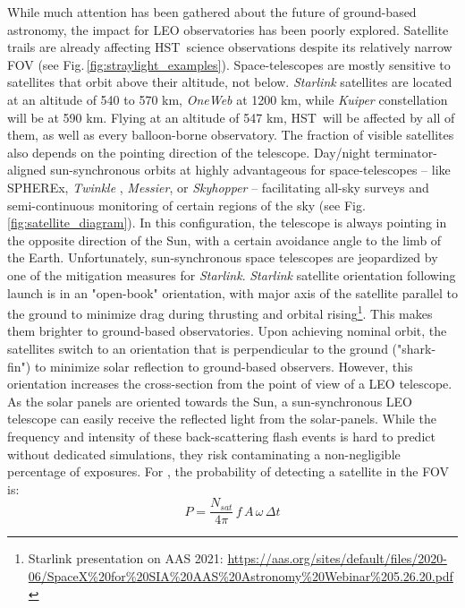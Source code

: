 \documentclass[usenames,dvipsnames,modern]{CLASS_FILES/aastex631}  %
\newcommand{\Hubble}{HST}
\begin{document}
While much attention has been gathered about the future of ground-based astronomy, the impact for LEO observatories has been poorly explored. Satellite trails are already affecting \Hubble\ science observations despite its relatively narrow FOV (see Fig.\,\ref{fig:straylight_examples}). Space-telescopes are mostly sensitive to satellites that orbit above their altitude, not below. \emph{Starlink} satellites are located at an altitude of 540 to 570 km, \emph{OneWeb} at 1200 km, while \emph{Kuiper} constellation will be at 590 km. Flying at an altitude of 547 km, \Hubble\ will be affected by all of them, as well as every balloon-borne observatory. The fraction of visible satellites also depends on the pointing direction of the telescope. Day/night terminator-aligned sun-synchronous orbits at highly advantageous for space-telescopes -- like SPHEREx, \emph{Twinkle} \citep{edwards+2020inproceedings_2027}, \emph{Messier}, or \emph{Skyhopper} -- facilitating all-sky surveys and semi-continuous monitoring of certain regions of the sky (see Fig.\,\ref{fig:satellite_diagram}). In this configuration, the telescope is always pointing in the opposite direction of the Sun, with a certain avoidance angle to the limb of the Earth. Unfortunately, sun-synchronous space telescopes are jeopardized by one of the mitigation measures for \emph{Starlink}. 
\emph{Starlink} satellite orientation following launch is in an "open-book" orientation, with major axis of the satellite parallel to the ground to minimize drag during thrusting and orbital rising\footnote{Starlink presentation on AAS 2021: \url{https://aas.org/sites/default/files/2020-06/SpaceX\%20for\%20SIA\%20AAS\%20Astronomy\%20Webinar\%205.26.20.pdf}}. This makes them brighter to ground-based observatories. Upon achieving nominal orbit, the satellites switch to an orientation that is perpendicular to the ground ("shark-fin") to minimize solar reflection to ground-based observers. However, this orientation increases the cross-section from the point of view of a LEO telescope. As the solar panels are oriented towards the Sun, a sun-synchronous LEO telescope can easily receive the reflected light from the solar-panels. While the frequency and intensity of these back-scattering flash events is hard to predict without dedicated simulations, they risk contaminating a non-negligible percentage of exposures. For \HST, the probability \citep{kruk2021misc} of detecting a satellite in the FOV is:
\begin{equation}
\label{eq:probability_satellite}
P = \frac{N_{sat}}{4 \pi}\,f\,A\,\omega\,\Delta t
\end{equation}
\end{document}
